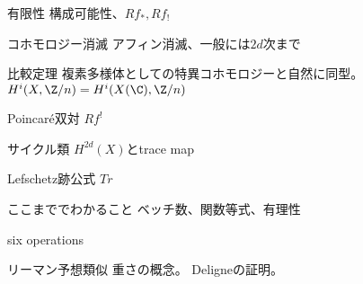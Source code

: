 \documentclass[dvipdfmx]{beamer}
\begin{document}
\begin{frame}{有限性}
  構成可能性、$Rf_*, Rf_!$
\end{frame}

\begin{frame}{コホモロジー消滅}
  アフィン消滅、一般には$2d$次まで
\end{frame}

\begin{frame}{比較定理}
  複素多様体としての特異コホモロジーと自然に同型。
  $H^i(X,\Z/n)=H^i(X(\C),\Z/n)$
\end{frame}

\begin{frame}{Poincar\'e双対}
  $Rf^!$
\end{frame}

\begin{frame}{サイクル類}
  $H^{2d}(X)$とtrace map
\end{frame}

\begin{frame}{Lefschetz跡公式}
  $Tr$
\end{frame}

\begin{frame}{ここまででわかること}
  ベッチ数、関数等式、有理性
\end{frame}

\begin{frame}{six operations}
\end{frame}

\begin{frame}{リーマン予想類似}
  重さの概念。
  Deligneの証明。
\end{frame}
\end{document}

